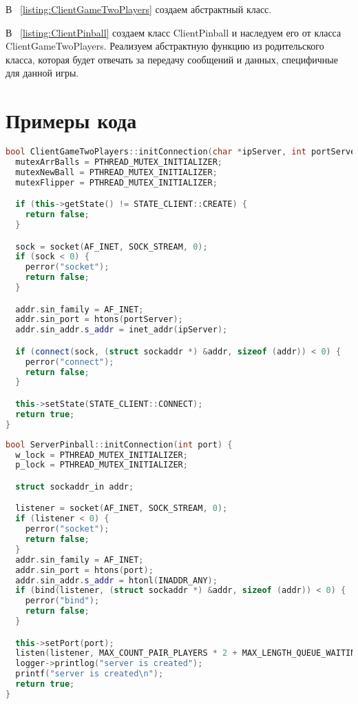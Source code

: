 В ~\ref{listing:ClientGameTwoPlayers} создаем абстрактный класс. 

В ~\ref{listing:ClientPinball} создаем класс ClientPinball и наследуем его от класса ClientGameTwoPlayers. Реализуем абстрактную функцию из родительского класса, которая будет отвечать за передачу сообщений и данных, специфичные для данной игры.







\section{Примеры кода}

\begin{lstlisting}[language=C++, caption={Создание соединения с сервером на клиенте},label=DescriptiveLabel]
bool ClientGameTwoPlayers::initConnection(char *ipServer, int portServer) {
  mutexArrBalls = PTHREAD_MUTEX_INITIALIZER;
  mutexNewBall = PTHREAD_MUTEX_INITIALIZER;
  mutexFlipper = PTHREAD_MUTEX_INITIALIZER;

  if (this->getState() != STATE_CLIENT::CREATE) {
    return false;
  }

  sock = socket(AF_INET, SOCK_STREAM, 0);
  if (sock < 0) {
    perror("socket");
    return false;
  }

  addr.sin_family = AF_INET;
  addr.sin_port = htons(portServer);
  addr.sin_addr.s_addr = inet_addr(ipServer);

  if (connect(sock, (struct sockaddr *) &addr, sizeof (addr)) < 0) {
    perror("connect");
    return false;
  }

  this->setState(STATE_CLIENT::CONNECT);
  return true;
}
\end{lstlisting}

\begin{lstlisting}[language=C++, caption={Подготовка сервера к слушанию клиентов},label=DescriptiveLabel]
bool ServerPinball::initConnection(int port) {
  w_lock = PTHREAD_MUTEX_INITIALIZER;
  p_lock = PTHREAD_MUTEX_INITIALIZER;

  struct sockaddr_in addr;

  listener = socket(AF_INET, SOCK_STREAM, 0);
  if (listener < 0) {
    perror("socket");
    return false;
  }
  addr.sin_family = AF_INET;
  addr.sin_port = htons(port);
  addr.sin_addr.s_addr = htonl(INADDR_ANY);
  if (bind(listener, (struct sockaddr *) &addr, sizeof (addr)) < 0) {
    perror("bind");
    return false;
  }

  this->setPort(port);
  listen(listener, MAX_COUNT_PAIR_PLAYERS * 2 + MAX_LENGTH_QUEUE_WAITING_PLAYERS);
  logger->printlog("server is created");
  printf("server is created\n");
  return true;
}
\end{lstlisting}


